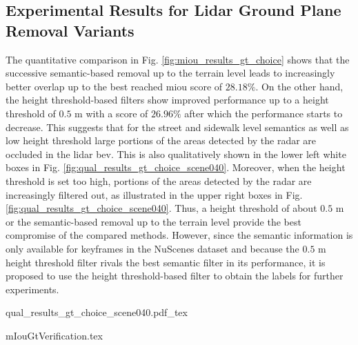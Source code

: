 \subsection{Experimental Results for Lidar Ground Plane Removal Variants}
\label{subsec:exp_results_gt}
The quantitative comparison in Fig. \ref{fig:miou_results_gt_choice} shows that the successive semantic-based removal up to the terrain level leads to increasingly better overlap up to the best reached m\gls{iou} score of $28.18\%$. On the other hand, the height threshold-based filters show improved performance up to a height threshold of $0.5$ m with a score of $26.96\%$ after which the performance starts to decrease. This suggests that for the street and sidewalk level semantics as well as low height threshold large portions of the areas detected by the radar are occluded in the lidar \gls{bev}. This is also qualitatively shown in the lower left white boxes in Fig. \ref{fig:qual_results_gt_choice_scene040}. Moreover, when the height threshold is set too high, portions of the areas detected by the radar are increasingly filtered out, as illustrated in the upper right boxes in Fig. \ref{fig:qual_results_gt_choice_scene040}. Thus, a height threshold of about $0.5$ m or the semantic-based removal up to the terrain level provide the best compromise of the compared methods. However, since the semantic information is only available for keyframes in the NuScenes dataset and because the $0.5$ m height threshold filter rivals the best semantic filter in its performance, it is proposed to use the height threshold-based filter to obtain the labels for further experiments.
\begin{center}
	{qual_results_gt_choice_scene040.pdf_tex}
\end{center}
\begin{center}
	{mIouGtVerification.tex}
\end{center}
%
